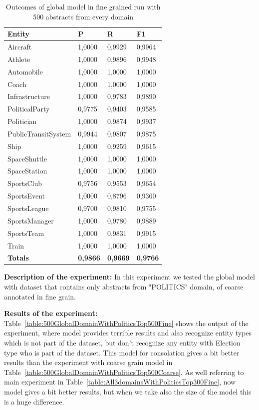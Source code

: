 \documentclass[thesis=M,english]{FITthesis}[2018/05/30]
\begin{document}
	\begin{table}[H]\centering
		\begin{tabular}{|l|l|l|l|}
			\hline {\textbf{Entity}} & {\textbf{P}} & {\textbf{R}} & {\textbf{F1}}\\\hline
				Aircraft & 1,0000 & 0,9929 & 0,9964\\
				Athlete & 1,0000 & 0,9896 & 0,9948\\
				Automobile & 1,0000 & 1,0000 & 1,0000\\ 
				Coach & 1,0000 & 1,0000 & 1,0000\\
				Infrastructure & 1,0000 & 0,9783 & 0,9890\\
				PoliticalParty & 0,9775 & 0,9403 & 0,9585\\
				Politician & 1,0000 & 0,9874 & 0,9937\\
				PublicTransitSystem & 0,9944 & 0,9807 & 0,9875\\
				Ship & 1,0000 & 0,9259 & 0,9615\\
				SpaceShuttle & 1,0000 & 1,0000 & 1,0000\\
				SpaceStation & 1,0000 & 1,0000 & 1,0000\\ 
				SportsClub & 0,9756 & 0,9553 & 0,9654\\
				SportsEvent & 1,0000 & 0,8796 & 0,9360\\
				SportsLeague & 0,9700 & 0,9810 & 0,9755\\
				SportsManager & 1,0000 & 0,9780 & 0,9889\\
				SportsTeam & 1,0000 & 0,9831 & 0,9915\\
				Train & 1,0000 & 1,0000 & 1,0000\\\hline
				\textbf{Totals} & \textbf{0,9866} & \textbf{0,9669} & \textbf{0,9766}\\\hline
		\end{tabular}
		\caption{Outcomes of global model in fine grained run with 500 abstracts from every domain \label{table:500GlobalDomainWithAllAbstractsTop500Fine}}
	\end{table}

\textbf{Description of the experiment:} In this experiment we tested the global model with dataset that contains only abstracts from "POLITICS" domain, of coarse annotated in fine grain.  

	\textbf{Results of the experiment:} Table~\ref{table:500GlobalDomainWithPoliticsTop500Fine} shows the output of the experiment, where model provides terrible results and also recognize entity types which is not part of the dataset, but don't recognize any entity with Election type who is part of the dataset. This model for consolation gives a bit better results than the experiment with coarse grain model in Table~\ref{table:500GlobalDomainWithPoliticsTop500Coarse}. As well referring to main experiment in Table~\ref{table:All3domainsWithPoliticsTop300Fine}, now model gives a bit better results, but when we take also the size of the model this is a huge difference.
\end{document}

